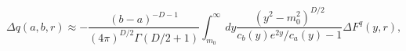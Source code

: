 \begin{equation}\label{deltaqabtoinf}
  \Delta q(a,b,r) \approx -\frac{(b-a)^{-D-1}}{(4\pi )^{D/2}
  \Gamma (D/2+1)}\int_{m_0}^{\infty }dy \frac{(y^2-
  m_0^2)^{D/2}}{c_b(y)e^{2y}/c_a(y)-1}\Delta F^{q}(y,r),
\end{equation}

